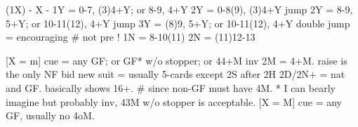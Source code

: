 (1X) - X -
1Y = 0-7, (3)4+Y; or 8-9, 4+Y
2Y = 0-8(9), (3)4+Y
jump 2Y = 8-9, 5+Y; or 10-11(12), 4+Y
jump 3Y = (8)9, 5+Y; or 10-11(12), 4+Y
double jump = encouraging  # not pre !
1N = 8-10(11)
2N = (11)12-13

[X = m] cue = any GF; or GF* w/o stopper; or 44+M inv 
    2M = 4+M. raise is the only NF bid 
        new suit = usually 5-cards except 2S after 2H
    2D/2N+ = nat and GF. basically shows 16+.  # since non-GF must have 4M.
    * I can bearly imagine but probably inv, 43M w/o stopper is acceptable.
[X = M] cue = any GF, usually no 4oM.